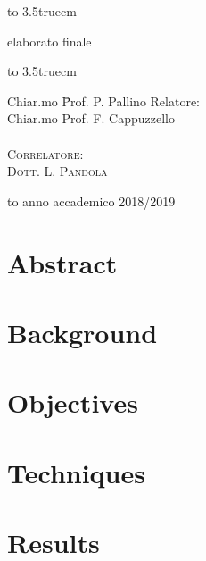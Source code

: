 \documentclass[10pt,foldmark,notumble]{leaflet}
\begin{document}
\begin{center}
\centerline{\hbox to 3.5truecm{\hrulefill}}
{\sc elaborato finale}\\
\centerline{\hbox to 3.5truecm{\hrulefill}}

\vfill

\begin{minipage}{\textwidth}
\begin{flushright}
\begin{minipage}{0.3\textwidth}
\begin{tabbing}
Chiar.mo \= Prof. P. Pallino \kill
Relatore: \> \\
Chiar.mo \> Prof. F. Cappuzzello \\
\\
\textsc{Correlatore:} \\
\textsc{Dott. L. Pandola}
\end{tabbing}
\end{minipage}
\end{flushright}
\end{minipage}

\vfill

\hbox to \textwidth{\hrulefill}
{\sc anno accademico 2018/2019}

\end{center}

\newpage

\section{Abstract}

\lipsum[1]

\section{Background}

\lipsum[2-4]

\section{Objectives}

\lipsum[5-7]

\section{Techniques}

\lipsum[8-10]

\section{Results}
\end{document}
